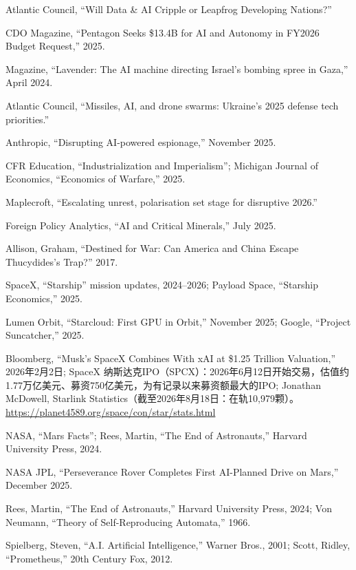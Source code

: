 \documentclass[11pt,a4paper]{ctexart}
\begin{document}
\noindent [64] Atlantic Council, ``Will Data \& AI Cripple or Leapfrog Developing Nations?''

\noindent [65] CDO Magazine, ``Pentagon Seeks \$13.4B for AI and Autonomy in FY2026 Budget Request,'' 2025.

 Magazine, ``Lavender: The AI machine directing Israel's bombing spree in Gaza,'' April 2024.

\noindent [67] Atlantic Council, ``Missiles, AI, and drone swarms: Ukraine's 2025 defense tech priorities.''

\noindent [68] Anthropic, ``Disrupting AI-powered espionage,'' November 2025.

\noindent [69] CFR Education, ``Industrialization and Imperialism''; Michigan Journal of Economics, ``Economics of Warfare,'' 2025.

\noindent [70] Maplecroft, ``Escalating unrest, polarisation set stage for disruptive 2026.''

\noindent [71] Foreign Policy Analytics, ``AI and Critical Minerals,'' July 2025.

\noindent [72] Allison, Graham, ``Destined for War: Can America and China Escape Thucydides's Trap?'' 2017.

\noindent [73] SpaceX, ``Starship'' mission updates, 2024--2026; Payload Space, ``Starship Economics,'' 2025.

\noindent [74] Lumen Orbit, ``Starcloud: First GPU in Orbit,'' November 2025; Google, ``Project Suncatcher,'' 2025.

\noindent [75] Bloomberg, ``Musk's SpaceX Combines With xAI at \$1.25 Trillion Valuation,'' 2026年2月2日; SpaceX 纳斯达克IPO（SPCX）：2026年6月12日开始交易，估值约1.77万亿美元、募资750亿美元，为有记录以来募资额最大的IPO; Jonathan McDowell, Starlink Statistics（截至2026年8月18日：在轨10,979颗）。\url{https://planet4589.org/space/con/star/stats.html}

\noindent [76] NASA, ``Mars Facts''; Rees, Martin, ``The End of Astronauts,'' Harvard University Press, 2024.

\noindent [77] NASA JPL, ``Perseverance Rover Completes First AI-Planned Drive on Mars,'' December 2025.

\noindent [78] Rees, Martin, ``The End of Astronauts,'' Harvard University Press, 2024; Von Neumann, ``Theory of Self-Reproducing Automata,'' 1966.

\noindent [79] Spielberg, Steven, ``A.I. Artificial Intelligence,'' Warner Bros., 2001; Scott, Ridley, ``Prometheus,'' 20th Century Fox, 2012.
\end{document}
